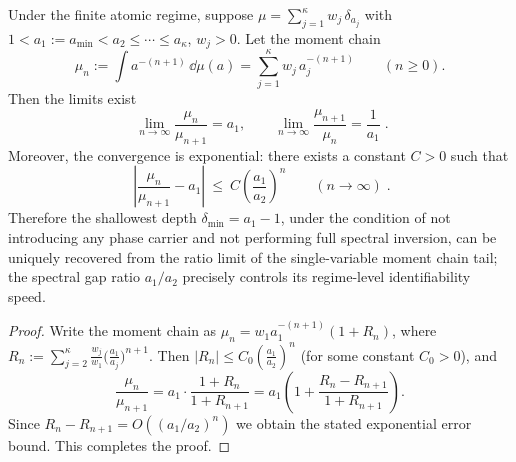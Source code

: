 \begin{proposition}\label{prop:xi-moment-ratio-identifies-amin}
Under the finite atomic regime, suppose
\(
\mu=\sum_{j=1}^{\kappa} w_j\,\delta_{a_j}
\)
with \(1<a_1:=a_{\min}<a_2\le\cdots\le a_{\kappa}\), \(w_j>0\).
Let the moment chain
\[
\mu_n:=\int a^{-(n+1)}\,\dd\mu(a)=\sum_{j=1}^{\kappa} w_j\,a_j^{-(n+1)}\qquad(n\ge 0).
\]
Then the limits exist
\[
\boxed{\;
\lim_{n\to\infty}\frac{\mu_n}{\mu_{n+1}}=a_1,
\qquad
\lim_{n\to\infty}\frac{\mu_{n+1}}{\mu_n}=\frac{1}{a_1}\; }.
\]
Moreover, the convergence is exponential: there exists a constant \(C>0\) such that
\[
\boxed{\;
\left|\frac{\mu_n}{\mu_{n+1}}-a_1\right|
\ \le\ C\left(\frac{a_1}{a_2}\right)^{n}\qquad(n\to\infty)\; }.
\]
Therefore the shallowest depth \(\delta_{\min}=a_1-1\), under the condition of not introducing any phase carrier and not performing full spectral inversion, can be uniquely recovered from the ratio limit of the single-variable moment chain tail; the spectral gap ratio \(a_1/a_2\) precisely controls its regime-level identifiability speed.
\end{proposition}
\begin{proof}
Write the moment chain as \(\mu_n=w_1a_1^{-(n+1)}(1+R_n)\), where
\(
R_n:=\sum_{j=2}^{\kappa}\frac{w_j}{w_1}\bigl(\frac{a_1}{a_j}\bigr)^{n+1}
\).
Then \(|R_n|\le C_0(\frac{a_1}{a_2})^{n}\) (for some constant \(C_0>0\)), and
\[
\frac{\mu_n}{\mu_{n+1}}
=a_1\cdot\frac{1+R_n}{1+R_{n+1}}
=a_1\left(1+\frac{R_n-R_{n+1}}{1+R_{n+1}}\right).
\]
Since \(R_n-R_{n+1}=O((a_1/a_2)^n)\) we obtain the stated exponential error bound. This completes the proof.
\end{proof}

